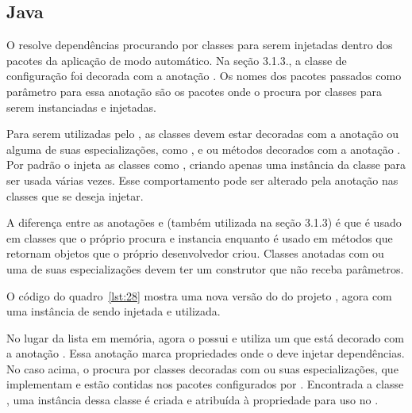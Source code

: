 \subsection{Java}

O  resolve dependências procurando por classes para serem injetadas dentro dos pacotes da aplicação de modo automático. Na seção 3.1.3., a classe de configuração  foi decorada com a anotação . Os nomes dos pacotes passados como parâmetro para essa anotação são os pacotes onde o  procura por classes para serem instanciadas e injetadas.

Para serem utilizadas pelo , as classes devem estar decoradas com a anotação  ou alguma de suas especializações, como ,  e  ou métodos decorados com a anotação . Por padrão o  injeta as classes como , criando apenas uma instância da classe para ser usada várias vezes. Esse comportamento pode ser alterado pela anotação  nas classes que se deseja injetar.

A diferença entre as anotações  e  (também utilizada na seção 3.1.3) é que  é usado em classes que o próprio  procura e instancia enquanto  é usado em métodos que retornam objetos que o próprio desenvolvedor criou. Classes anotadas com  ou uma de suas especializações devem ter um construtor que não receba parâmetros.

O código do quadro~\ref{lst:28} mostra uma nova versão do   do projeto , agora com uma instância de  sendo injetada e utilizada.


No lugar da lista em memória, agora o  possui e utiliza um  que  está decorado com a anotação . Essa anotação marca propriedades onde o  deve injetar dependências. No caso acima, o  procura por classes decoradas com  ou suas especializações, que implementam  e estão contidas nos pacotes configurados por . Encontrada a classe , uma instância dessa classe é criada e atribuída à propriedade  para uso no .

